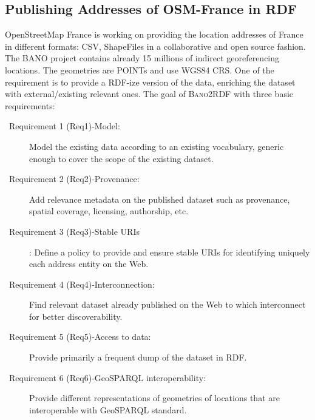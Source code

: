 \subsection{Publishing Addresses of OSM-France in RDF}
\label{sec:bano2rdf}
OpenStreetMap France is working on providing the location addresses of France in different formats: CSV, ShapeFiles in a collaborative and open source fashion. The BANO project contains already 15 millions of indirect georeferencing locations. The geometries are POINTs and use WGS84 CRS. One of the requirement is to provide a RDF-ize version of the data, enriching the dataset with external/existing relevant ones. The goal of \textsc{Bano2RDF} with three basic requirements:
\begin{description}
\item [~Requirement 1 (Req1)-Model:] Model the existing data according to an existing vocabulary, generic enough to cover the scope of the existing dataset. 
\item[~Requirement 2 (Req2)-Provenance:] Add relevance metadata on the published dataset  such as provenance, spatial coverage, licensing, authorship, etc.
\item[~Requirement 3 (Req3)-Stable URIs]: Define a policy to provide and ensure stable URIs for identifying uniquely each address entity on the Web.
\item[~Requirement 4 (Req4)-Interconnection:] Find relevant dataset already published on the Web to which interconnect for better discoverability.

\item[~Requirement 5 (Req5)-Access to data:] Provide primarily a frequent dump of the dataset in RDF.

\item[~Requirement 6 (Req6)-GeoSPARQL interoperability:] Provide different representations of geometries of locations that are interoperable with GeoSPARQL standard.

\end{description}


